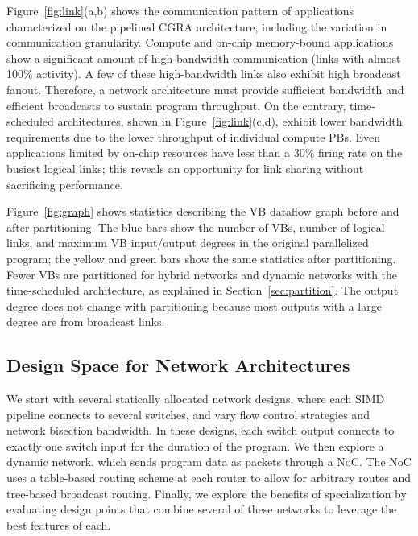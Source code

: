 Figure~\ref{fig:link}(a,b) shows the communication pattern of applications
characterized on the pipelined CGRA architecture, including the variation in communication granularity. 
Compute and on-chip memory-bound applications show a significant amount of high-bandwidth communication (links with almost 100\% activity). 
A few of these high-bandwidth links also exhibit high broadcast fanout. 
Therefore, a network architecture must provide sufficient bandwidth and efficient broadcasts to sustain program throughput.
On the contrary, time-scheduled architectures, shown in Figure~\ref{fig:link}(c,d), exhibit
lower bandwidth requirements due to the lower throughput of individual compute PBs. 
Even applications limited by on-chip resources have less than a 30\% firing rate on the busiest logical links; this reveals an opportunity for link sharing without sacrificing performance.

Figure~\ref{fig:graph} shows statistics describing the VB dataflow graph before and after partitioning.
The blue bars show the number of VBs, number of logical links, and maximum VB input/output degrees in the original parallelized program; the yellow and green bars show the same statistics after partitioning. 
Fewer VBs are partitioned for hybrid networks and dynamic networks with the time-scheduled architecture, as explained in Section~\ref{sec:partition}. 
The output degree does not change with partitioning because most outputs with a large degree are from broadcast links.


\subsection{Design Space for Network Architectures} \label{sec:network}

We start with several statically allocated network designs, where each SIMD pipeline connects to several switches, and vary flow control strategies and network bisection bandwidth.
In these designs, each switch output connects to exactly one switch input for the duration of the program.
We then explore a dynamic network, which sends program data as packets through a NoC.
The NoC uses a table-based routing scheme at each router to allow for arbitrary routes and tree-based broadcast routing.
Finally, we explore the benefits of specialization by evaluating design points that combine several of these networks to leverage the best features of each.

